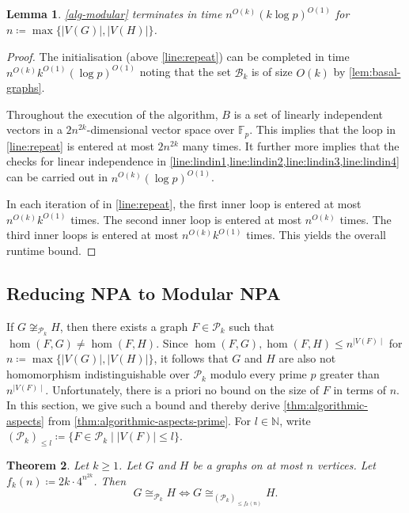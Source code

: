 \documentclass[11pt,a4paper]{article}
\theoremstyle{plain}
\newtheorem{thm}{Theorem}[section]
\newtheorem{lem}[thm]{Lemma}
\theoremstyle{remark}
\theoremstyle{definition}
\begin{document}
\begin{lem} \label{lem:runtime}
    \cref{alg-modular} terminates in time $n^{O(k)} (k \log p)^{O(1)}$ for $n \coloneqq \max \{\lvert V(G) \rvert , \lvert V(H) \rvert  \}$.
\end{lem}
\begin{proof}
	The initialisation (above \cref{line:repeat}) can be completed in time $n^{O(k)} k^{O(1)} (\log p)^{O(1)}$ noting that the set $\mathcal{B}_k$ is of size $O(k)$ by \cref{lem:basal-graphs}.
	
    Throughout the execution of the algorithm, $B$ is a set of linearly independent vectors in a $2n^{2k}$-dimensional vector space over $\mathbb{F}_p$.
    This implies that the loop in \cref{line:repeat} is entered at most $2n^{2k}$ many times.
    It further more implies that the checks for linear independence in \cref{line:lindin1,line:lindin2,line:lindin3,line:lindin4} can be carried out in $n^{O(k)} (\log p)^{O(1)}$.

	In each iteration of in \cref{line:repeat}, 
	the first inner loop is entered at most $n^{O(k)} k^{O(1)}$ times.
	The second inner loop is entered at most $n^{O(k)}$ times.
	The third inner loops is entered at most $n^{O(k)} k^{O(1)}$ times.
	This yields the overall runtime bound.
\end{proof}

\subsection{Reducing NPA to Modular NPA}

If $G \not\cong_{\mathcal{P}_k} H$, then there exists a graph $F \in \mathcal{P}_k$ such that $\hom(F, G) \neq \hom(F, H)$.
Since $\hom(F, G), \hom(F, H) \leq n^{\mid V(F)\mid }$ for $n \coloneqq \max\{\lvert V(G) \rvert , \lvert V(H) \rvert \}$, 
it follows that $G$ and $H$ are also not homomorphism indistinguishable over $\mathcal{P}_k$ modulo every prime $p$ greater than $n^{\mid V(F)\mid }$.
Unfortunately, there is a priori no bound on the size of $F$ in terms of $n$.
In this section, we give such a bound and thereby derive \cref{thm:algorithmic-aspects} from \cref{thm:algorithmic-aspects-prime}.
For $l \in \mathbb{N}$, 
write $(\mathcal{P}_k)_{\leq l} \coloneqq \{ F \in \mathcal{P}_k \mid \lvert V(F)\lvert  \leq l\}$.

\begin{thm} \label{thm:witness-function}
	Let $k \geq 1$.
	Let $G$ and $H$ be a graphs on at most $n$ vertices.
	Let $f_k(n) \coloneqq 2k \cdot 4^{n^{2k}}$.
	Then 
	\[
		G \cong_{\mathcal{P}_k} H \iff
		G \cong_{(\mathcal{P}_k)_{\leq f_k(n)}} H.
	\]
\end{thm}
\end{document}
